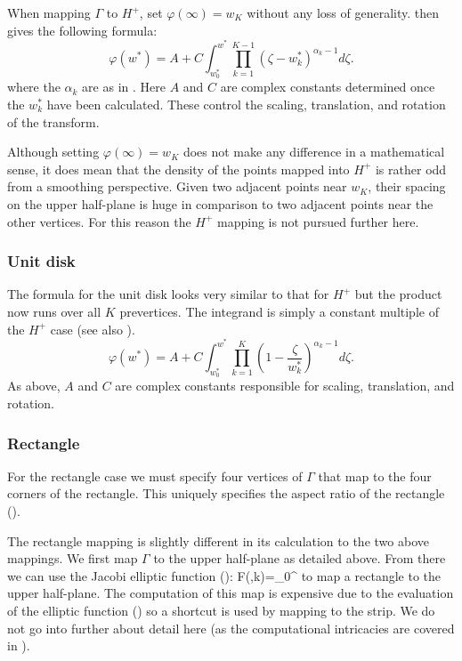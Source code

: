 When mapping $\Gamma$ to $H^+$, set $\varphi(\infty) = w_K$ without any loss of generality.  then gives the following formula:
\begin{equation}
\varphi(w^*) = A + C \int^{w^*}_{w^*_0} \prod_{k=1}^{K-1} \left (\zeta-w^*_k \right )^{\alpha_k-1} d\zeta.
\end{equation}
where the $\alpha_k$ are as in . Here $A$ and $C$ are complex constants determined once the $w^*_k$ have been calculated. These control the scaling, translation, and rotation of the transform.

Although setting $\varphi(\infty) = w_K$ does not make any difference in a mathematical sense, it does mean that the density of the points mapped into $H^+$ is rather odd from a smoothing perspective. Given two adjacent points near $w_K$, their spacing on the upper half-plane is huge in comparison to two adjacent points near the other vertices. For this reason the $H^+$ mapping is not pursued further here.

\subsubsection{Unit disk}

The formula for the unit disk looks very similar to that for $H^+$ but the product now runs over all $K$ prevertices. The integrand is simply a constant multiple of the $H^+$ case (see also \cite[p. 12]{driscoll}).
\begin{equation}
\label{unitscmap}
\varphi(w^*) = A + C \int^{w^*}_{w^*_0} \prod_{k=1}^{K} \left (1 - \frac{\zeta}{w^*_k} \right )^{\alpha_k-1} d\zeta.
\end{equation}
As above, $A$ and $C$ are complex constants responsible for scaling, translation, and rotation.

\subsubsection{Rectangle}
For the rectangle case we must specify four vertices of $\Gamma$ that map to the four corners of the rectangle. This uniquely specifies the aspect ratio of the rectangle (\cite[p. 48]{driscoll}).

The rectangle mapping is slightly different in its calculation to the two above mappings. We first map $\Gamma$ to the upper half-plane as detailed above. From there we can use the Jacobi elliptic function (\cite[p. 701]{handbuch}):
\be
F(\gamma,k)=\int_0^\gamma {}
\ee
to map a rectangle to the upper half-plane. The computation of this map is expensive due to the evaluation of the elliptic function (\cite[p. 49]{driscoll}) so a shortcut is used by mapping to the strip. We do not go into further about detail here (as the computational intricacies are covered in \cite{howell90}).

